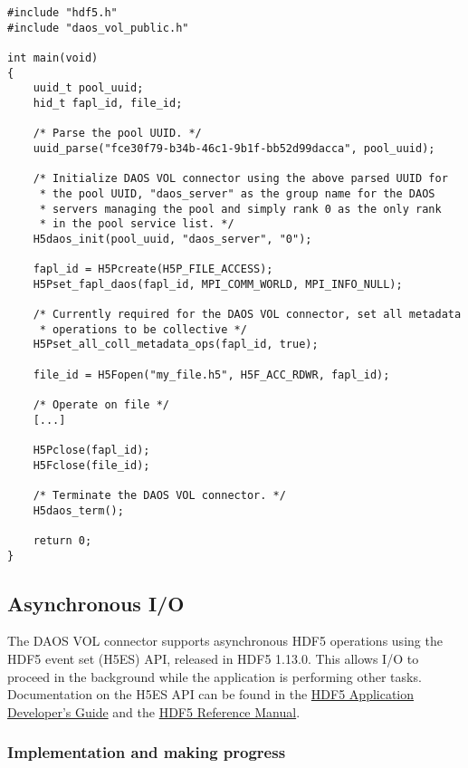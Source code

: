 \documentclass[../users_guide.tex]{subfiles}
\begin{document}
\begin{verbatim}
#include "hdf5.h"
#include "daos_vol_public.h"

int main(void)
{
    uuid_t pool_uuid;
    hid_t fapl_id, file_id;

    /* Parse the pool UUID. */
    uuid_parse("fce30f79-b34b-46c1-9b1f-bb52d99dacca", pool_uuid);

    /* Initialize DAOS VOL connector using the above parsed UUID for
     * the pool UUID, "daos_server" as the group name for the DAOS
     * servers managing the pool and simply rank 0 as the only rank
     * in the pool service list. */
    H5daos_init(pool_uuid, "daos_server", "0");

    fapl_id = H5Pcreate(H5P_FILE_ACCESS);
    H5Pset_fapl_daos(fapl_id, MPI_COMM_WORLD, MPI_INFO_NULL);

    /* Currently required for the DAOS VOL connector, set all metadata
     * operations to be collective */
    H5Pset_all_coll_metadata_ops(fapl_id, true); 

    file_id = H5Fopen("my_file.h5", H5F_ACC_RDWR, fapl_id);

    /* Operate on file */
    [...]

    H5Pclose(fapl_id);
    H5Fclose(file_id);

    /* Terminate the DAOS VOL connector. */
    H5daos_term();

    return 0;
}
\end{verbatim}

\subsection{Asynchronous I/O}

The DAOS VOL connector supports asynchronous HDF5 operations using the HDF5
event set (H5ES) API, released in HDF5 1.13.0. This allows I/O to proceed in the
background while the application is performing other tasks. Documentation on the
H5ES API can be found in the
\href{https://portal.hdfgroup.org/display/HDF5/Asynchronous+operations+with+HDF5+VOL+connectors}{HDF5 Application Developer's Guide} and the
\href{https://portal.hdfgroup.org/display/HDF5/Event+Set}{HDF5 Reference Manual}.


\subsubsection{Implementation and making progress}
\end{document}
